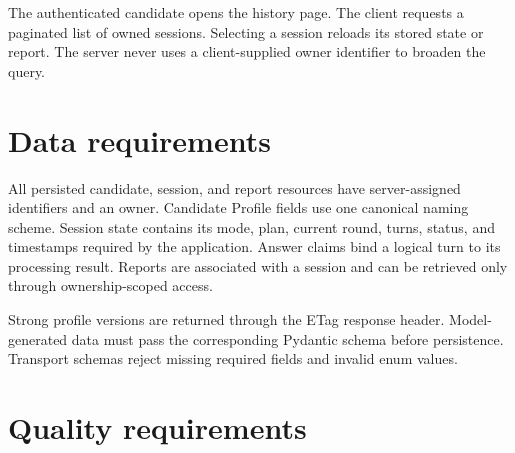 The authenticated candidate opens the history page. The client requests a paginated list of owned sessions. Selecting a session reloads its stored state or report. The server never uses a client-supplied owner identifier to broaden the query.

\section{Data requirements}

All persisted candidate, session, and report resources have server-assigned identifiers and an owner. Candidate Profile fields use one canonical naming scheme. Session state contains its mode, plan, current round, turns, status, and timestamps required by the application. Answer claims bind a logical turn to its processing result. Reports are associated with a session and can be retrieved only through ownership-scoped access.

Strong profile versions are returned through the ETag response header. Model-generated data must pass the corresponding Pydantic schema before persistence. Transport schemas reject missing required fields and invalid enum values.

\section{Quality requirements}

